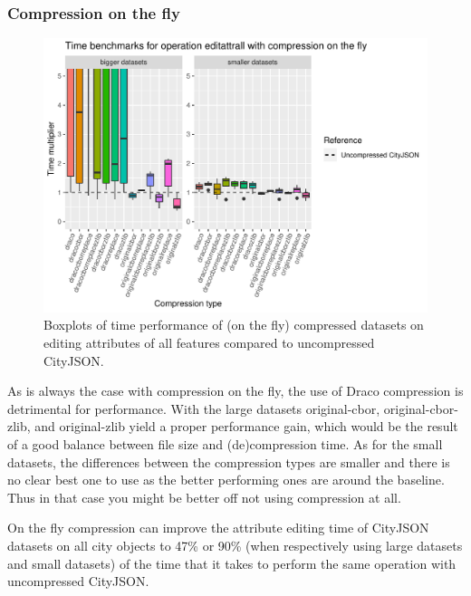 \clearpage

\subsubsection{Compression on the fly}

\begin{figure}[h!]
    \includegraphics[scale=0.92]{figs/benchmark/individualotf/editattrall.pdf}
    \caption{Boxplots of time performance of (on the fly) compressed datasets on editing attributes of all features compared to uncompressed CityJSON.}
    \label{figotf:sdvis}
\end{figure}


As is always the case with compression on the fly, the use of Draco compression is detrimental for performance.
With the large datasets original-cbor, original-cbor-zlib, and original-zlib yield a proper performance gain, which would be the result of a good balance between file size and (de)compression time.
As for the small datasets, the differences between the compression types are smaller and there is no clear best one to use as the better performing ones are around the baseline.
Thus in that case you might be better off not using compression at all.


On the fly compression can improve the attribute editing time of CityJSON datasets on all city objects to 47\% or 90\% (when respectively using large datasets and small datasets) of the time that it takes to perform the same operation with uncompressed CityJSON.



